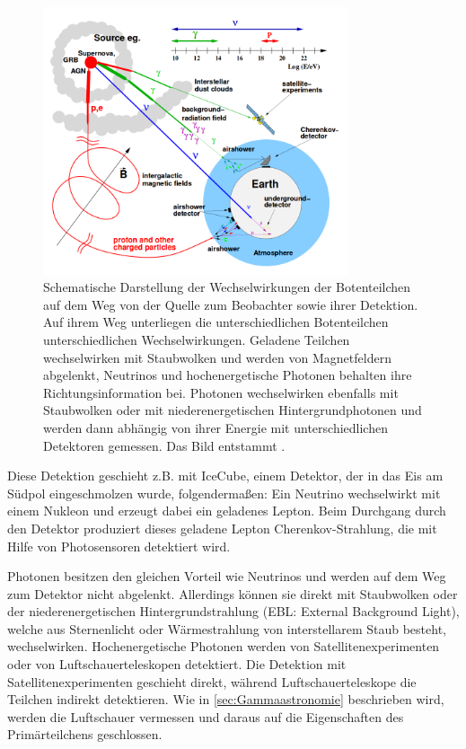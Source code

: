 \begin{figure}
    \centering
    \includegraphics[width=0.8\textwidth]{./Plots/02_Astroteilchenphysik/Astroteilchen.png}
    \caption{Schematische Darstellung der Wechselwirkungen der Botenteilchen auf dem Weg von der Quelle zum Beobachter sowie ihrer Detektion.
    Auf ihrem Weg unterliegen die unterschiedlichen Botenteilchen unterschiedlichen Wechselwirkungen. 
    Geladene Teilchen wechselwirken mit Staubwolken und werden von Magnetfeldern abgelenkt, Neutrinos und hochenergetische Photonen behalten ihre Richtungsinformation bei.
    Photonen wechselwirken ebenfalls mit Staubwolken oder mit niederenergetischen Hintergrundphotonen und werden dann abhängig von ihrer Energie mit unterschiedlichen Detektoren gemessen. 
    Das Bild entstammt \cite{DissMarlene}.}
    \label{Astroteilchen}
\end{figure}

Diese Detektion geschieht z.B. mit IceCube, einem Detektor, der in das Eis am Südpol eingeschmolzen wurde, folgendermaßen:
Ein Neutrino wechselwirkt mit einem Nukleon und erzeugt dabei ein geladenes Lepton. 
Beim Durchgang durch den Detektor produziert dieses geladene Lepton Cherenkov-Strahlung, die mit Hilfe von Photosensoren detektiert wird.

Photonen besitzen den gleichen Vorteil wie Neutrinos und werden auf dem Weg zum Detektor nicht abgelenkt.
Allerdings können sie direkt mit Staubwolken oder der niederenergetischen Hintergrundstrahlung (EBL: External Background Light), welche aus Sternenlicht oder Wärmestrahlung von interstellarem Staub besteht, wechselwirken.
Hochenergetische Photonen werden von Satellitenexperimenten oder von Luftschauerteleskopen detektiert.
Die Detektion mit Satellitenexperimenten geschieht direkt, während Luftschauerteleskope die Teilchen indirekt detektieren.
Wie in \autoref{sec:Gammaastronomie} beschrieben wird, werden die Luftschauer vermessen und daraus auf die Eigenschaften des Primärteilchens geschlossen.


